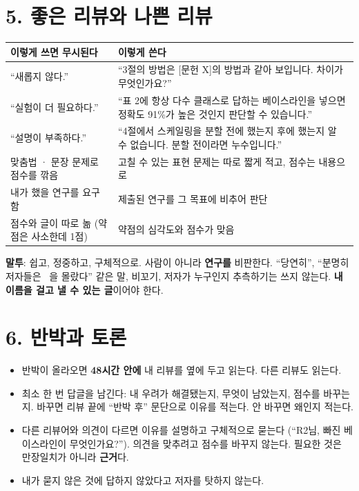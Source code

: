 \documentclass[11pt]{article}
\begin{document}
\section*{5. 좋은 리뷰와 나쁜 리뷰}
\begin{center}
\small
\begin{tabular}{@{}p{6.6cm}p{6.6cm}@{}}
\toprule
\textbf{이렇게 쓰면 무시된다} & \textbf{이렇게 쓴다} \\
\midrule
``새롭지 않다.'' & ``3절의 방법은 [문헌 X]의 방법과 같아 보입니다. 차이가 무엇인가요?'' \\
``실험이 더 필요하다.'' & ``표 2에 항상 다수 클래스로 답하는 베이스라인을 넣으면 정확도 91\%가 높은 것인지 판단할 수 있습니다.'' \\
``설명이 부족하다.'' & ``4절에서 스케일링을 분할 전에 했는지 후에 했는지 알 수 없습니다. 분할 전이라면 누수입니다.'' \\
맞춤법 · 문장 문제로 점수를 깎음 & 고칠 수 있는 표현 문제는 따로 짧게 적고, 점수는 내용으로 \\
내가 했을 연구를 요구함 & 제출된 연구를 그 목표에 비추어 판단 \\
점수와 글이 따로 놂 (약점은 사소한데 1점) & 약점의 심각도와 점수가 맞음 \\
\bottomrule
\end{tabular}
\end{center}

\noindent\textbf{말투}: 쉽고, 정중하고, 구체적으로. 사람이 아니라 \textbf{연구를} 비판한다. ``당연히'', ``분명히 저자들은 ~을 몰랐다'' 같은 말, 비꼬기, 저자가 누구인지 추측하기는 쓰지 않는다. \textbf{내 이름을 걸고 낼 수 있는 글}이어야 한다.

\section*{6. 반박과 토론}
\begin{itemize}
\item 반박이 올라오면 \textbf{48시간 안에} 내 리뷰를 옆에 두고 읽는다. 다른 리뷰도 읽는다.
\item 최소 한 번 답글을 남긴다: 내 우려가 해결됐는지, 무엇이 남았는지, 점수를 바꾸는지. 바꾸면 리뷰 끝에 ``반박 후'' 문단으로 이유를 적는다. 안 바꾸면 왜인지 적는다.
\item 다른 리뷰어와 의견이 다르면 이유를 설명하고 구체적으로 묻는다 (``R2님, 빠진 베이스라인이 무엇인가요?''). 의견을 맞추려고 점수를 바꾸지 않는다. 필요한 것은 만장일치가 아니라 \textbf{근거}다.
\item 내가 묻지 않은 것에 답하지 않았다고 저자를 탓하지 않는다.
\end{itemize}
\end{document}
